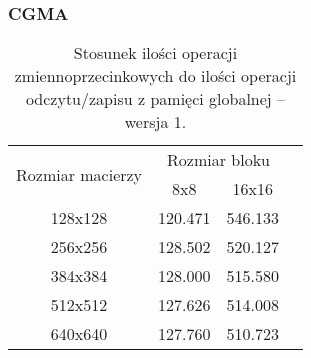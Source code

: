 \subsubsection{CGMA}

\begin{table}[H]
\centering
\begin{tabular}{|c|c|c|c|}
\hline
\multirow{2}{*}{Rozmiar macierzy} & \multicolumn{2}{c|}{Rozmiar bloku} \\ \cline{2-3}
& 8x8 & 16x16 \\ \hline
128x128 & 120.471 & 546.133 \\ \hline
256x256 & 128.502 & 520.127 \\ \hline
384x384 & 128.000 & 515.580 \\ \hline
512x512 & 127.626 & 514.008 \\ \hline
640x640 & 127.760 & 510.723 \\ \hline
\end{tabular}
\caption{Stosunek ilości operacji zmiennoprzecinkowych do ilości operacji odczytu/zapisu z pamięci globalnej -- wersja 1.}
\end{table}

